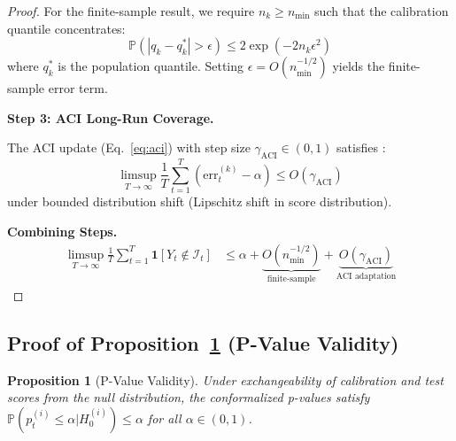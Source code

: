 \documentclass{article}
\theoremstyle{plain}
\newtheorem{proposition}[theorem]{Proposition}
\theoremstyle{definition}
\theoremstyle{remark}
\begin{document}
\begin{proof}
For the finite-sample result, we require $n_k \geq n_{\min}$ such that the calibration quantile concentrates:
\begin{equation}
\mathbb{P}\left(|q_k - q_k^*| > \epsilon\right) \leq 2\exp(-2n_k\epsilon^2)
\end{equation}
where $q_k^*$ is the population quantile. Setting $\epsilon = O(n_{\min}^{-1/2})$ yields the finite-sample error term.

\textbf{Step 3: ACI Long-Run Coverage.}

The ACI update (Eq.~\ref{eq:aci}) with step size $\gamma_{\text{ACI}} \in (0, 1)$ satisfies \citep{gibbs2021adaptive}:
\begin{equation}
\limsup_{T \to \infty} \frac{1}{T}\sum_{t=1}^T (\text{err}_t^{(k)} - \alpha) \leq O(\gamma_{\text{ACI}})
\end{equation}
under bounded distribution shift (Lipschitz shift in score distribution).

\textbf{Combining Steps.}
\begin{align}
\limsup_{T \to \infty} \frac{1}{T}\sum_{t=1}^T \mathbf{1}[Y_t \notin \mathcal{I}_t] &\leq \alpha + \underbrace{O(n_{\min}^{-1/2})}_{\text{finite-sample}} + \underbrace{O(\gamma_{\text{ACI}})}_{\text{ACI adaptation}}
\end{align}
\end{proof}

\subsection{Proof of Proposition~\ref{prop:pvalue_valid} (P-Value Validity)}
\label{app:proof_pvalue}

\begin{proposition}[P-Value Validity]
\label{prop:pvalue_valid}
Under exchangeability of calibration and test scores from the null distribution, the conformalized p-values satisfy $\mathbb{P}(p_t^{(i)} \leq \alpha | H_0^{(i)}) \leq \alpha$ for all $\alpha \in (0,1)$.
\end{proposition}
\end{document}
